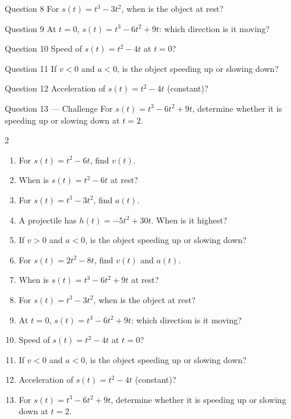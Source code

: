 \documentclass[11pt]{article}
\begin{document}
\begin{qbox}{Question 8}
For $s(t)=t^3-3t^2$, when is the object at rest?\workspace{2.4cm}
\end{qbox}

\begin{qbox}{Question 9}
At $t=0$, $s(t)=t^3-6t^2+9t$: which direction is it moving?\workspace{2.4cm}
\end{qbox}

\begin{qbox}{Question 10}
Speed of $s(t)=t^2-4t$ at $t=0$?\workspace{2.4cm}
\end{qbox}

\begin{qbox}{Question 11}
If $v<0$ and $a<0$, is the object speeding up or slowing down?\workspace{2.4cm}
\end{qbox}

\begin{qbox}{Question 12}
Acceleration of $s(t)=t^2-4t$ (constant)?\workspace{2.4cm}
\end{qbox}

\begin{qbox}{Question 13 --- Challenge}
For $s(t)=t^3-6t^2+9t$, determine whether it is speeding up or slowing down at $t=2$.\workspace{3cm}
\end{qbox}

\clearpage
{}

\begin{recapbox}
\begin{multicols}{2}
\small
\begin{enumerate}[leftmargin=*,itemsep=3pt]
  \item For $s(t)=t^2-6t$, find $v(t)$.
  \item When is $s(t)=t^2-6t$ at rest?
  \item For $s(t)=t^3-3t^2$, find $a(t)$.
  \item A projectile has $h(t)=-5t^2+30t$. When is it highest?
  \item If $v>0$ and $a<0$, is the object speeding up or slowing down?
  \item For $s(t)=2t^2-8t$, find $v(t)$ and $a(t)$.
  \item When is $s(t)=t^3-6t^2+9t$ at rest?
  \item For $s(t)=t^3-3t^2$, when is the object at rest?
  \item At $t=0$, $s(t)=t^3-6t^2+9t$: which direction is it moving?
  \item Speed of $s(t)=t^2-4t$ at $t=0$?
  \item If $v<0$ and $a<0$, is the object speeding up or slowing down?
  \item Acceleration of $s(t)=t^2-4t$ (constant)?
  \item For $s(t)=t^3-6t^2+9t$, determine whether it is speeding up or slowing down at $t=2$.
\end{enumerate}
\end{multicols}
\end{recapbox}
\end{document}
